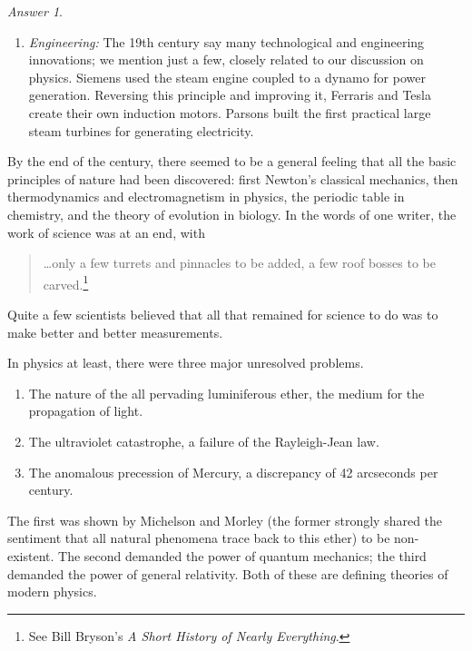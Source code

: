 \documentclass[11pt]{article}
\theoremstyle{remark}
\newtheorem*{answer}{Answer}
\begin{document}
\begin{answer}
\begin{enumerate}
            \item \textit{Engineering:} The 19th century say many technological and
            engineering innovations; we mention just a few, closely related to our
            discussion on physics. Siemens used the steam engine coupled to a dynamo
            for power generation. Reversing this principle and improving it, Ferraris
            and Tesla create their own induction motors. Parsons built the first
            practical large steam turbines for generating electricity.
        \end{enumerate}

        By the end of the century, there seemed to be a general feeling that all the
        basic principles of nature had been discovered: first Newton's classical
        mechanics, then thermodynamics and electromagnetism in physics, the periodic
        table in chemistry, and the theory of evolution in biology. In the words of
        one writer, the work of science was at an end, with \begin{quote}
            \dots only a few turrets and pinnacles to be added, a few roof bosses to
            be carved.\footnote{See Bill Bryson's \emph{A Short History of Nearly
            Everything}.}
        \end{quote}
        Quite a few scientists believed that all that remained for science to do was
        to make better and better measurements.

        In physics at least, there were three major unresolved problems. \begin{enumerate}
            \itemsep0em
            \item The nature of the all pervading luminiferous ether, the medium for
            the propagation of light.
            \item The ultraviolet catastrophe, a failure of the Rayleigh-Jean law.
            \item The anomalous precession of Mercury, a discrepancy of 42 arcseconds
            per century.
        \end{enumerate}
        The first was shown by Michelson and Morley (the former strongly shared the
        sentiment that all natural phenomena trace back to this ether) to be
        non-existent. The second demanded the power of quantum mechanics; the third
        demanded the power of general relativity. Both of these are defining theories
        of modern physics.


\end{answer}
\end{document}

